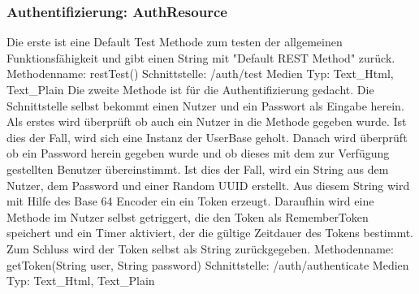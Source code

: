 \documentclass[german]{book}
\begin{document}
\subsubsection{Authentifizierung: AuthResource}
Die erste ist eine Default Test Methode zum testen der allgemeinen Funktionsfähigkeit und gibt einen String mit "Default REST Method" zurück. 
\newline
Methodenname: restTest()
\newline
Schnittstelle: /auth/test
\newline
Medien Typ: Text\_Html, Text\_Plain
\newline
\newline
Die zweite Methode ist für die Authentifizierung gedacht. Die Schnittstelle selbst bekommt einen Nutzer und ein Passwort als Eingabe herein. Als erstes wird überprüft ob auch ein Nutzer in die Methode gegeben wurde. Ist dies der Fall, wird sich eine Instanz der UserBase geholt. Danach wird überprüft ob ein Password herein gegeben wurde und ob dieses mit dem zur Verfügung gestellten Benutzer übereinstimmt. 
\newline
\newline
Ist dies der Fall, wird ein String aus dem Nutzer, dem Password und einer Random UUID erstellt.  Aus diesem String wird mit Hilfe des Base 64 Encoder ein 
ein Token erzeugt. Daraufhin wird eine Methode im Nutzer selbst getriggert, die den Token als RememberToken speichert und ein Timer aktiviert, der die gültige Zeitdauer des Tokens bestimmt. Zum Schluss wird der Token selbst als String zurückgegeben.
\newline
Methodenname: getToken(String user, String password)
\newline
Schnittstelle: /auth/authenticate
\newline
Medien Typ: Text\_Html, Text\_Plain
\end{document}
